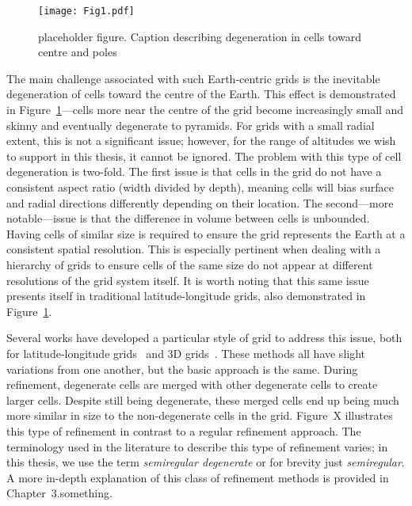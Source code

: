 \begin{figure}[h]
	\texttt{[image: Fig1.pdf]}
	\caption{placeholder figure.
		Caption describing degeneration in cells toward centre and poles}
	\label{fig:3dllg}
\end{figure}


The main challenge associated with such Earth-centric grids is the inevitable degeneration of cells toward the centre of the Earth.
This effect is demonstrated in Figure~\ref{fig:3dllg}---cells more near the centre of the grid become increasingly small and skinny and eventually degenerate to pyramids.
For grids with a small radial extent, this is not a significant issue; however, for the range of altitudes we wish to support in this thesis, it cannot be ignored.
The problem with this type of cell degeneration is two-fold.
The first issue is that cells in the grid do not have a consistent aspect ratio (width divided by depth), meaning cells will bias surface and radial directions differently depending on their location.
The second---more notable---issue is that the difference in volume between cells is unbounded.
Having cells of similar size is required to ensure the grid represents the Earth at a consistent spatial resolution.
This is especially pertinent when dealing with a hierarchy of grids to ensure cells of the same size do not appear at different resolutions of the grid system itself.
It is worth noting that this same issue presents itself in traditional latitude-longitude grids, also demonstrated in Figure~\ref{fig:3dllg}.


Several works have developed a particular style of grid to address this issue, both for latitude-longitude grids~\cite{leopardi2006partition, sun2008global} and 3D grids~\cite{yu2009sdog, gang2013sphere, wang2013global}\cite{others}.
These methods all have slight variations from one another, but the basic approach is the same.
During refinement, degenerate cells are merged with other degenerate cells to create larger cells. %
Despite still being degenerate, these merged cells end up being much more similar in size to the non-degenerate cells in the grid.
Figure~X illustrates this type of refinement in contrast to a regular refinement approach.
The terminology used in the literature to describe this type of refinement varies; in this thesis, we use the term \textit{semiregular degenerate} or for brevity just \textit{semiregular}.
A more in-depth explanation of this class of refinement methods is provided in Chapter~3.something.


